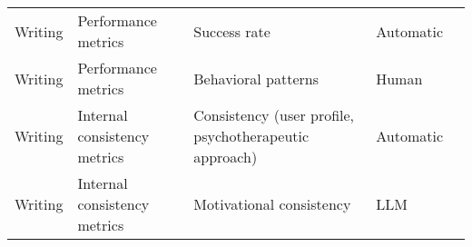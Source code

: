 \begin{small}
\begin{center}
\begin{longtable}{@{}p{}p{}p{}p{}p{}@{}}
Writing                  & Performance metrics                 & Success rate                                                                                                                                                                                                & Automatic & \cite{10.1145/3649921.3656987}                                                                                                                                                                                                                                                                                                                                                                                       \\
Writing                  & Performance metrics                 & Behavioral patterns                                                                                                                                                                                         & Human     & \cite{10.1145/3613904.3642545}                                                                                                                                                                                                                                                                                                                                                                          \\
Writing                  & Internal consistency metrics        & Consistency (user profile, psychotherapeutic approach)                                                                                                                                                      & Automatic & \cite{mishra-etal-2023-e}                                                                                                                                                                                                                                                                                                                                                                                        \\
Writing                  & Internal consistency metrics        & Motivational consistency                                                                                                                                                                                    & LLM       & \cite{10.1145/3649921.3656987}                                                                                                                                                                                                                                                                                                                                                                                       \\

\end{longtable}
\end{center}
\end{small}
